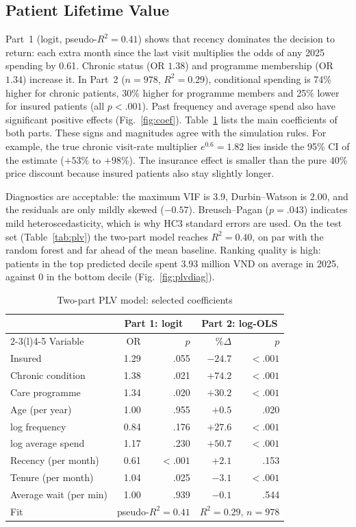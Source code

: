 \documentclass[conference]{IEEEtran}
\begin{document}
\subsection{Patient Lifetime Value}
Part~1 (logit, pseudo-$R^2=0.41$) shows that recency dominates the decision to return: each extra month since the last visit multiplies the odds of any 2025 spending by 0.61. Chronic status (OR $1.38$) and programme membership (OR $1.34$) increase it. In Part~2 ($n=978$, $R^2=0.29$), conditional spending is 74\% higher for chronic patients, 30\% higher for programme members and 25\% lower for insured patients (all $p<.001$). Past frequency and average spend also have significant positive effects (Fig.~\ref{fig:coef}). Table~\ref{tab:twopart} lists the main coefficients of both parts. These signs and magnitudes agree with the simulation rules. For example, the true chronic visit-rate multiplier $e^{0.6}=1.82$ lies inside the 95\% CI of the estimate ($+53\%$ to $+98\%$). The insurance effect is smaller than the pure 40\% price discount because insured patients also stay slightly longer.

Diagnostics are acceptable: the maximum VIF is 3.9, Durbin--Watson is 2.00, and the residuals are only mildly skewed ($-0.57$). Breusch--Pagan ($p=.043$) indicates mild heteroscedasticity, which is why HC3 standard errors are used. On the test set (Table~\ref{tab:plv}) the two-part model reaches $R^2=0.40$, on par with the random forest and far ahead of the mean baseline. Ranking quality is high: patients in the top predicted decile spent 3.93 million VND on average in 2025, against 0 in the bottom decile (Fig.~\ref{fig:plvdiag}).

\begin{table}[t]
\caption{Two-part PLV model: selected coefficients}\label{tab:twopart}
\centering\footnotesize
\setlength{\tabcolsep}{4pt}
\begin{tabular}{@{}lrrrr@{}}
\toprule
& \multicolumn{2}{c}{Part 1: logit} & \multicolumn{2}{c}{Part 2: log-OLS}\\
\cmidrule(lr){2-3}\cmidrule(l){4-5}
Variable & OR & $p$ & $\%\Delta$ & $p$\\
\midrule
Insured & 1.29 & .055 & $-24.7$ & $<.001$\\
Chronic condition & 1.38 & .021 & $+74.2$ & $<.001$\\
Care programme & 1.34 & .020 & $+30.2$ & $<.001$\\
Age (per year) & 1.00 & .955 & $+0.5$ & .020\\
log frequency & 0.84 & .176 & $+27.6$ & $<.001$\\
log average spend & 1.17 & .230 & $+50.7$ & $<.001$\\
Recency (per month) & 0.61 & $<.001$ & $+2.1$ & .153\\
Tenure (per month) & 1.04 & .025 & $-3.1$ & $<.001$\\
Average wait (per min) & 1.00 & .939 & $-0.1$ & .544\\
\midrule
Fit & \multicolumn{2}{c}{pseudo-$R^2=0.41$} & \multicolumn{2}{c}{$R^2=0.29$, $n=978$}\\
\bottomrule
\end{tabular}
\end{table}
\end{document}

